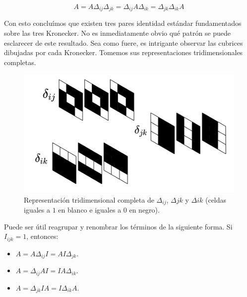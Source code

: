 $$A = A \Delta_{ij} \Delta_{jk} = \Delta_{ij} A \Delta_{ik} = \Delta_{jk} \Delta_{ik} A$$

Con esto concluímos que existen tres pares identidad estándar fundamentados sobre las tres Kronecker. No es inmediatamente obvio qué patrón se puede esclarecer de este resultado. Sea como fuere, es intrigante observar las cubrices dibujadas por cada Kronecker. Tomemos sus representaciones tridimensionales completas.

\begin{figure}[H]
	\includegraphics[width=\linewidth]{media/kroneckers.png}
	\caption{Representación tridimensional completa de $\Delta_{ij}$, $\Delta{jk}$ y $\Delta{ik}$ (celdas iguales a $1$ en blanco e iguales a $0$ en negro).}
\end{figure}

Puede ser útil reagrupar y renombrar los términos de la siguiente forma. Si $I_{ijk} = 1$, entonces:

\begin{itemize}
	\item $A = A \Delta_{ij} I = A I \Delta_{jk}$.
	\item $A = \Delta_{ij} A I = I A \Delta_{ik}$.
	\item $A = \Delta_{jk} I A = I \Delta_{ik} A$.
\end{itemize}
